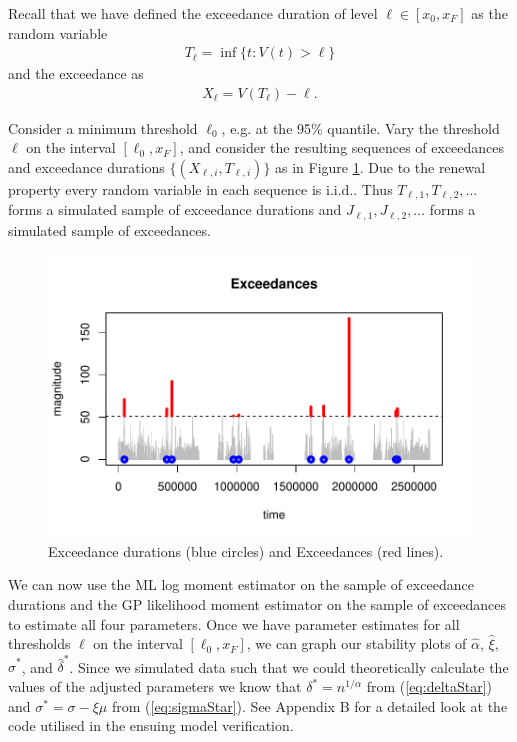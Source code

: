 \documentclass[honours,12pt]{unswthesis}
\newcommand{\1}{\mathbf 1}
\numberwithin{equation}{section}
\theoremstyle{definition}
\theoremstyle{remark}
\begin{document}
Recall that we have defined the exceedance duration of level $\ell \in [x_0,x_F]$ as
the random variable
\begin{align*}
T_\ell = \inf\{t: V(t) > \ell\}
\end{align*}
and the exceedance as 
\begin{align*}
X_\ell = V(T_\ell) - \ell.
\end{align*}

Consider a minimum threshold $\ell_0$, e.g. at the 95\% quantile.
Vary the threshold $\ell$ on the interval $[\ell_0, x_F]$, and consider
the resulting sequences of exceedances and exceedance durations 
$\{(X_{\ell,i}, T_{\ell,i})\}$ as in Figure \ref{fig:thresholdedBursty}. 
Due to the renewal property every random variable in each sequence is i.i.d.. Thus $T_{\ell,1}, T_{\ell,2}, \ldots$ forms a simulated sample of exceedance durations and $J_{\ell,1}, J_{\ell,2}, \ldots$ forms a simulated sample of exceedances.


\begin{figure}[h]
    \centering
    \includegraphics[width=\textwidth]{Figures/Exceedances.pdf}
    \caption{Exceedance durations (blue circles) and Exceedances (red lines).}\label{fig:thresholdedBursty}
\end{figure}

We can now use the ML log moment estimator on the sample of exceedance durations and the GP likelihood moment estimator on the sample of exceedances to estimate all four parameters. Once we have parameter estimates for all thresholds $\ell$ on the interval $[\ell_0, x_F]$, we can graph our stability plots of $\hat \alpha$, $\hat\xi,$ $\hat\sigma^{*}$, and $\hat\delta^{*}$. Since we simulated data such that we could theoretically calculate the values of the adjusted parameters we know that $\delta^{*}=n^{1/\alpha}$ from (\ref{eq:deltaStar}) and $\sigma^{*}=\sigma-\xi\mu$ from (\ref{eq:sigmaStar}). See Appendix B for a detailed look at the code utilised in the ensuing model verification.
\end{document}
